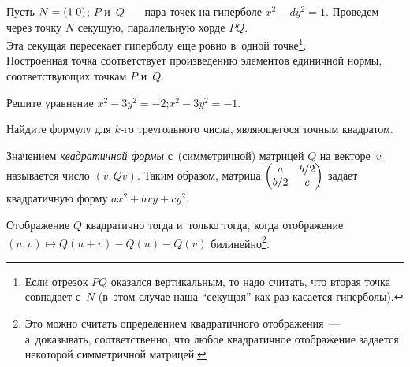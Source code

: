 \documentclass[a4paper, 11pt]{article}
\begin{document}
Пусть $N=(1\;0)$; $P$ и~$Q$~--- пара точек на гиперболе $x^2-dy^2=1$. Проведем через точку $N$ секущую, параллельную хорде $PQ$.
\\ Эта секущая пересекает гиперболу еще ровно в~одной точке\footnote{Если отрезок $PQ$ оказался вертикальным, то надо считать, что вторая точка совпадает с~$N$ (в~этом случае наша ``секущая'' как раз касается гиперболы).}.
\\ Построенная точка соответствует произведению элементов единичной нормы, соответствующих точкам $P$ и~$Q$.





Решите уравнение  $x^2-3y^2=-2$;\quad {} $x^2-3y^2=-1$.






Найдите формулу для $k$-го треугольного числа, являющегося точным квадратом.






Значением \emph{квадратичной формы} с~(симметричной) матрицей $Q$ на векторе~$v$ называется число $(v,Qv)$.
Таким образом, матрица $\begin{pmatrix}a & b/2 \\ b/2 & c\end{pmatrix}$ задает квадратичную форму $ax^2+bxy+cy^2$.




Отображение $Q$ квадратично тогда и~только тогда, когда отображение $(u,v)\mapsto Q(u+v)-Q(u)-Q(v)$ билинейно\footnote{Это можно считать определением квадратичного отображения~--- а~доказывать, соответственно, что любое квадратичное отображение задается некоторой симметричной матрицей.}.
\end{document}
